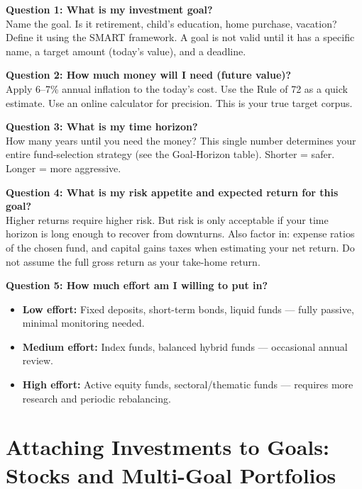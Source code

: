 \documentclass[12pt,a4paper]{article}
\begin{document}
\begin{tcolorbox}[base, colback=SoftGray, colframe=DarkGray, breakable]

\textbf{\color{PrimaryBlue}Question 1: What is my investment goal?}\\
Name the goal. Is it retirement, child's education, home purchase, vacation? Define it using the SMART framework. A goal is not valid until it has a specific name, a target amount (today's value), and a deadline.

\bigskip
\textbf{\color{PrimaryBlue}Question 2: How much money will I need (future value)?}\\
Apply 6--7\% annual inflation to the today's cost. Use the Rule of 72 as a quick estimate. Use an online calculator for precision. This is your true target corpus.

\bigskip
\textbf{\color{PrimaryBlue}Question 3: What is my time horizon?}\\
How many years until you need the money? This single number determines your entire fund-selection strategy (see the Goal-Horizon table). Shorter = safer. Longer = more aggressive.

\bigskip
\textbf{\color{PrimaryBlue}Question 4: What is my risk appetite and expected return for this goal?}\\
Higher returns require higher risk. But risk is only acceptable if your time horizon is long enough to recover from downturns. Also factor in: expense ratios of the chosen fund, and capital gains taxes when estimating your net return. Do not assume the full gross return as your take-home return.

\bigskip
\textbf{\color{PrimaryBlue}Question 5: How much effort am I willing to put in?}
\par\smallskip
\begin{itemize}
  \item \textbf{Low effort:} Fixed deposits, short-term bonds, liquid funds --- fully passive, minimal monitoring needed.
  \item \textbf{Medium effort:} Index funds, balanced hybrid funds --- occasional annual review.
  \item \textbf{High effort:} Active equity funds, sectoral/thematic funds --- requires more research and periodic rebalancing.
\end{itemize}
\end{tcolorbox}

\section{Attaching Investments to Goals: Stocks and Multi-Goal Portfolios}
\end{document}
